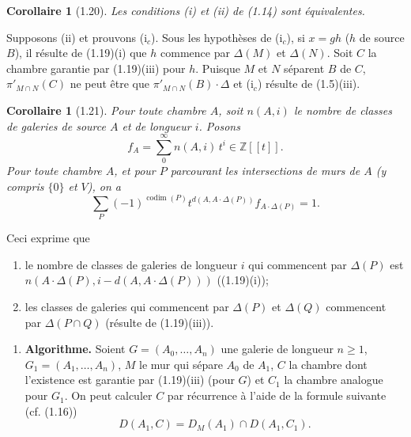 \documentclass[12pt]{article}
\newtheorem{corollaire}[theoreme]{Corollaire}
\theoremstyle{remark}
\newcommand{\Z}{\mathbb{Z}}
\begin{document}
\begin{corollaire}[1.20]
Les conditions (i) et (ii) de (1.14) sont équivalentes.
\end{corollaire}

Supposons (ii) et prouvons (i$_c$). Sous les hypothèses de (i$_c$), si $x = gh$ ($h$ de source $B$), il résulte de (1.19)(i) que $h$ commence par $\Delta(M)$ et $\Delta(N)$. Soit $C$ la chambre garantie par (1.19)(iii) pour $h$. Puisque $M$ et $N$ séparent $B$ de $C$, $\pi'_{M \cap N}(C)$ ne peut être que $\pi'_{M \cap N}(B) \cdot \Delta$ et (i$_c$) résulte de (1.5)(iii).

\begin{center}
\end{center}

\begin{corollaire}[1.21]
Pour toute chambre $A$, soit $n(A, i)$ le nombre de classes de galeries de source $A$ et de longueur $i$. Posons
\[f_A = \sum_0^{\infty} n(A, i) \, t^i \in \Z[[t]].\]
Pour toute chambre $A$, et pour $P$ parcourant les intersections de murs de $A$ (y compris $\{0\}$ et $V$), on a
\[\sum_P (-1)^{\operatorname{codim}(P)} t^{d(A, A \cdot \Delta(P))} f_{A \cdot \Delta(P)} = 1.\]
\end{corollaire}

Ceci exprime que
\begin{enumerate}
\item[a)] le nombre de classes de galeries de longueur $i$ qui commencent par $\Delta(P)$ est $n(A \cdot \Delta(P), i - d(A, A \cdot \Delta(P)))$ ((1.19)(i));
\item[b)] les classes de galeries qui commencent par $\Delta(P)$ et $\Delta(Q)$ commencent par $\Delta(P \cap Q)$ (résulte de (1.19)(iii)).
\end{enumerate}

\begin{enumerate}
\item[(1.22)] \textbf{Algorithme.} Soient $G = (A_0, \ldots, A_n)$ une galerie de longueur $n \geq 1$, $G_1 = (A_1, \ldots, A_n)$, $M$ le mur qui sépare $A_0$ de $A_1$, $C$ la chambre dont l'existence est garantie par (1.19)(iii) (pour $G$) et $C_1$ la chambre analogue pour $G_1$. On peut calculer $C$ par récurrence à l'aide de la formule suivante (cf. (1.16))
\begin{equation}
D(A_1, C) = D_M(A_1) \cap D(A_1, C_1).\tag{1.22.1}
\end{equation}
\end{enumerate}
\end{document}
